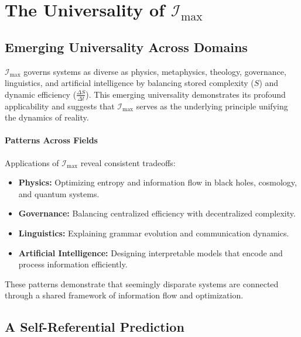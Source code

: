 \documentclass[12pt]{article}
\begin{document}
\section{The Universality of \(\mathcal{I}_{\text{max}}\)}

\subsection{Emerging Universality Across Domains}
\(\mathcal{I}_{\text{max}}\) governs systems as diverse as physics, metaphysics, theology, governance, linguistics, and artificial intelligence by balancing stored complexity (\(S\)) and dynamic efficiency (\(\frac{\Delta S}{\Delta t}\)). This emerging universality demonstrates its profound applicability and suggests that \(\mathcal{I}_{\text{max}}\) serves as the underlying principle unifying the dynamics of reality.

\paragraph{Patterns Across Fields}
Applications of \(\mathcal{I}_{\text{max}}\) reveal consistent tradeoffs:
\begin{itemize}
    \item \textbf{Physics:} Optimizing entropy and information flow in black holes, cosmology, and quantum systems.
    \item \textbf{Governance:} Balancing centralized efficiency with decentralized complexity.
    \item \textbf{Linguistics:} Explaining grammar evolution and communication dynamics.
    \item \textbf{Artificial Intelligence:} Designing interpretable models that encode and process information efficiently.
\end{itemize}

These patterns demonstrate that seemingly disparate systems are connected through a shared framework of information flow and optimization.

\subsection{A Self-Referential Prediction}
\end{document}
